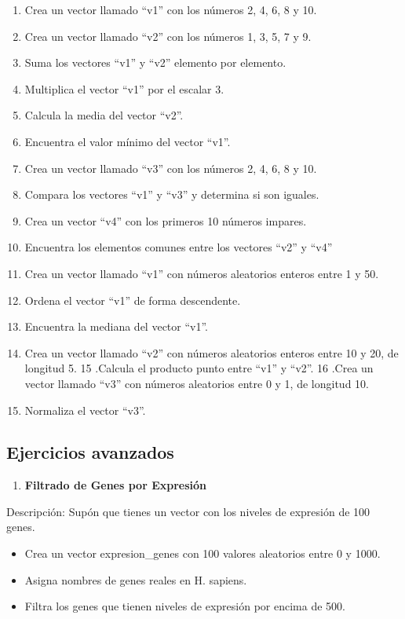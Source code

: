\documentclass[
]{book}
\providecommand{\tightlist}{%
  \setlength{\itemsep}{0pt}\setlength{\parskip}{0pt}}
\begin{document}
\begin{enumerate}
\def\labelenumi{\arabic{enumi}.}
\tightlist
\item
  Crea un vector llamado ``v1'' con los números 2, 4, 6, 8 y 10.
\item
  Crea un vector llamado ``v2'' con los números 1, 3, 5, 7 y 9.
\item
  Suma los vectores ``v1'' y ``v2'' elemento por elemento.
\item
  Multiplica el vector ``v1'' por el escalar 3.
\item
  Calcula la media del vector ``v2''.
\item
  Encuentra el valor mínimo del vector ``v1''.
\item
  Crea un vector llamado ``v3'' con los números 2, 4, 6, 8 y 10.
\item
  Compara los vectores ``v1'' y ``v3'' y determina si son iguales.
\item
  Crea un vector ``v4'' con los primeros 10 números impares.
\item
  Encuentra los elementos comunes entre los vectores ``v2'' y ``v4''
\item
  Crea un vector llamado ``v1'' con números aleatorios enteros entre 1 y 50.
\item
  Ordena el vector ``v1'' de forma descendente.
\item
  Encuentra la mediana del vector ``v1''.
\item
  Crea un vector llamado ``v2'' con números aleatorios enteros entre 10 y 20, de longitud 5.
  15 .Calcula el producto punto entre ``v1'' y ``v2''.
  16 .Crea un vector llamado ``v3'' con números aleatorios entre 0 y 1, de longitud 10.
\item
  Normaliza el vector ``v3''.
\end{enumerate}

\subsection{Ejercicios avanzados}\label{ejercicios-avanzados}

\begin{enumerate}
\def\labelenumi{\arabic{enumi}.}
\tightlist
\item
  \textbf{Filtrado de Genes por Expresión}
\end{enumerate}

Descripción: Supón que tienes un vector con los niveles de expresión de 100 genes.

\begin{itemize}
\tightlist
\item
  Crea un vector expresion\_genes con 100 valores aleatorios entre 0 y 1000.
\item
  Asigna nombres de genes reales en H. sapiens.
\item
  Filtra los genes que tienen niveles de expresión por encima de 500.
\end{itemize}
\end{document}
